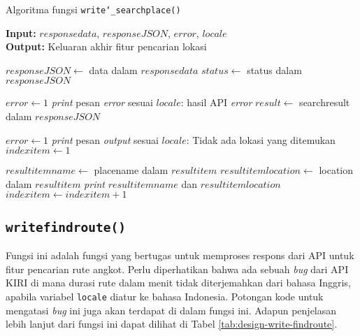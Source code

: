 \begin{algorithm}[h]
	\caption{\textendash\xspace Algoritma fungsi \texttt{write\char`_searchplace()}}
	\label{alg:design-write-searchplace}
	\vspace{-0.6\baselineskip}
	\begin{flushleft}
		\textbf{Input:} $responsedata$, $responseJSON$, $error$, $locale$ \\
		\textbf{Output:} Keluaran akhir fitur pencarian lokasi \\
	\end{flushleft}
	\vspace{-1.05\baselineskip}
	\begin{algorithmic}
		\State $responseJSON \gets$ data dalam $responsedata$
		\State $status \gets$ \textquotesingle\textquotesingle status\textquotesingle\textquotesingle\xspace dalam $responseJSON$
		
			\State $error \gets 1$
			\State \textit{print} pesan \textit{error} sesuai $locale$: hasil API \textit{error}
		\Else
			\State $result \gets$ \textquotesingle\textquotesingle searchresult\textquotesingle\textquotesingle\xspace dalam $responseJSON$
			
				\State $error \gets 1$
				\State \textit{print} pesan \textit{output} sesuai $locale$: Tidak ada lokasi yang ditemukan
			\Else
				\State $indexitem \gets 1$
				
				 
					\State $resultitemname \gets$ \textquotesingle\textquotesingle placename\textquotesingle\textquotesingle\xspace dalam $resultitem$
					\State $resultitemlocation \gets$ \textquotesingle\textquotesingle location\textquotesingle\textquotesingle\xspace dalam $resultitem$
					\State \textit{print} $resultitemname$ dan $resultitemlocation$
					\State $indexitem \gets indexitem + 1$
				\EndFor
			\EndIf
		\EndIf
	\end{algorithmic}
\end{algorithm}
	
\subsection{\texttt{write\textunderscore findroute()}}
\label{sec:design-code-write-findroute}

Fungsi ini adalah fungsi yang bertugas untuk memproses respons dari API untuk fitur pencarian rute angkot. Perlu diperhatikan bahwa ada sebuah \textit{bug} dari API KIRI di mana durasi rute dalam menit tidak diterjemahkan dari bahasa Inggris, apabila variabel \verb|locale| diatur ke bahasa Indonesia. Potongan kode untuk mengatasi \textit{bug} ini juga akan terdapat di dalam fungsi ini. Adapun penjelasan lebih lanjut dari fungsi ini dapat dilihat di Tabel \ref{tab:design-write-findroute}.

